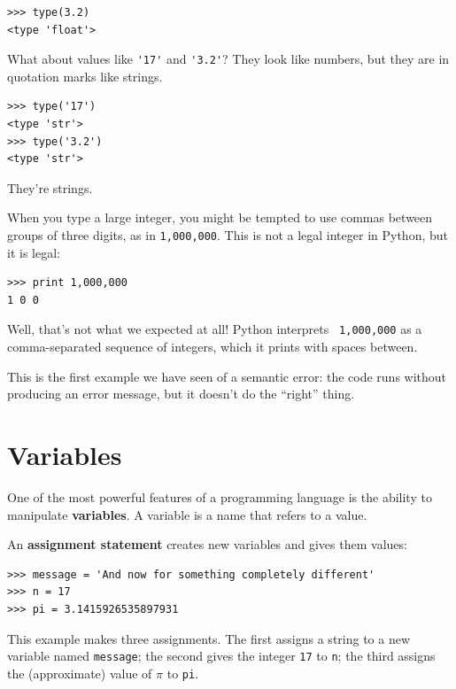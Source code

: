 \documentclass[10pt]{book}
\begin{document}

\beforeverb
\begin{verbatim}
>>> type(3.2)
<type 'float'>
\end{verbatim}
\afterverb
%
What about values like \verb"'17'" and \verb"'3.2'"?
They look like numbers, but they are in quotation marks like
strings.


\beforeverb
\begin{verbatim}
>>> type('17')
<type 'str'>
>>> type('3.2')
<type 'str'>
\end{verbatim}
\afterverb
%
They're strings.

When you type a large integer, you might be tempted to use commas
between groups of three digits, as in {\tt 1,000,000}.  This is not a
legal integer in Python, but it is legal:

\beforeverb
\begin{verbatim}
>>> print 1,000,000
1 0 0
\end{verbatim}
\afterverb
%
Well, that's not what we expected at all!  Python interprets {\tt
  1,000,000} as a comma-separated sequence of integers, which it
prints with spaces between.


This is the first example we have seen of a semantic error: the code
runs without producing an error message, but it doesn't do the
``right'' thing.


\section{Variables}

One of the most powerful features of a programming language is the
ability to manipulate {\bf variables}.  A variable is a name that
refers to a value.

An {\bf assignment statement} creates new variables and gives
them values:

\beforeverb
\begin{verbatim}
>>> message = 'And now for something completely different'
>>> n = 17
>>> pi = 3.1415926535897931
\end{verbatim}
\afterverb
%
This example makes three assignments.  The first assigns a string
to a new variable named {\tt message};
the second gives the integer {\tt 17} to {\tt n}; the third
assigns the (approximate) value of $\pi$ to {\tt pi}.
\end{document}
